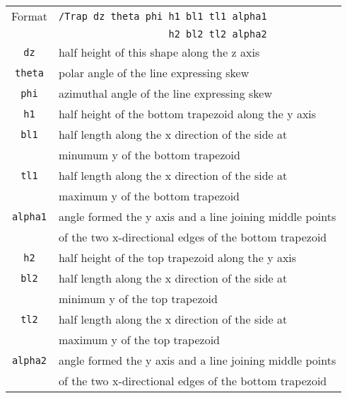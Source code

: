 \begin{tabular}{|c|l|}
\hline%
Format & \verb+/Trap dz theta phi h1 bl1 tl1 alpha1+ \\
       & \verb+                   h2 bl2 tl2 alpha2+ \\
\hline%
\verb+dz+     & half height of this shape along the z axis \\
\hline%
\verb+theta+  & polar angle of the line expressing skew \\
\hline%
\verb+phi+    & azimuthal angle of the line expressing skew \\
\hline%
\verb+h1+     & half height of the bottom trapezoid along the y axis \\
\hline%
\verb+bl1+    & half length along the x direction of the side at \\
              & minumum y of the bottom trapezoid\\
\hline%
\verb+tl1+    & half length along the x direction of the side at \\
              & maximum y of the bottom trapezoid \\
\hline%
\verb+alpha1+ & angle formed the y axis and a line joining middle points \\
              & of the two x-directional edges of the bottom trapezoid \\
\hline%
\verb+h2+     & half height of the top trapezoid along the y axis \\
\hline%
\verb+bl2+    & half length along the x direction of the side at \\
              & minimum y of the top trapezoid \\
\hline%
\verb+tl2+    & half length along the x direction of the side at \\
              & maximum y of the top trapezoid \\
\hline%
\verb+alpha2+ & angle formed the y axis and a line joining middle points \\
              & of the two x-directional edges of the bottom trapezoid\\
\hline%
\end{tabular}


